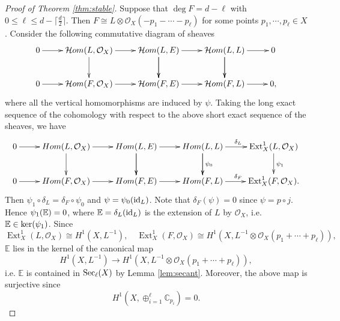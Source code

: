 \documentclass[12pt]{article}
\begin{document}
\begin{proof}[Proof of Theorem \ref{thm:stable}]
Suppose that $\deg F = d - \ell $ with $0 \leq \ell \leq d - \lceil \frac{d}{2} \rceil $. Then $F \cong L \otimes \mathcal O_{X}(-p_{1} - \cdots - p_{\ell})$ for some points $p_{1}, \cdots, p_{\ell} \in X$. Consider the following commutative diagram of sheaves
\[ \xymatrix{
0 \ar[r] & \mathcal{H}om(L, \mathcal O_{X}) \ar@{->}[d] \ar[r] & \mathcal{H}om(L, E)\ar[d]\ar@{->}[d]  \ar[r] &\mathcal{H}om(L, L) \ar[d]\ar@{->}[d] \ar[r] &0 \\
0 \ar[r] & \mathcal{H}om(F, \mathcal O_{X}) \ar[r]                         & \mathcal{H}om(F, E) \ar[r]                                 &\mathcal{H}om(F, L) \ar[r]                                  &0,
} \]
where all the vertical homomorphisms are induced by $\psi$. Taking the long exact sequence of the cohomology with respect to the above short exact sequence of the sheaves, we have
\[ \xymatrix{
0 \ar[r] & Hom(L, \mathcal O_{X}) \ar@{->}[d] \ar[r] & Hom(L, E)\ar[d]\ar@{->}[d]  \ar[r] &Hom(L, L) \ar[d]^{\psi_{0}}\ar@{->}[d] \ar[r]^{\delta_{L}} & \operatorname{Ext}^{1}_{X}(L, \mathcal O_{X})\ar[d]^{\psi_{1}} \\
0 \ar[r] & Hom(F, \mathcal O_{X}) \ar[r]                         & Hom(F, E) \ar[r]                                 &Hom(F, L) \ar[r]^{\delta_{F}}                                  &\operatorname{Ext}^{1}_{X}(F, \mathcal O_{X}).
} \]
Then $\psi_{1} \circ \delta_{L} = \delta_{F} \circ \psi_{0}$ and $\psi = \psi_{0} ({\rm id}_{L})$. Note that $\delta_{F}(\psi) = 0$ since $\psi = p \circ j$. Hence $\psi_{1} ({\Bbb E}) = 0$, where ${\Bbb E} = \delta_{L} ({\rm id}_{L})$ is the extension of $L$ by $\mathcal O_{X}$, i.e. ${\Bbb E} \in \ker (\psi_{1})$. Since
\[ \operatorname{Ext}_{X}^{1}(L, \mathcal O_{X}) \cong H^{1}(X, L^{-1}), \quad \operatorname{Ext}_{X}^{1}(F, \mathcal O_{X}) \cong H^{1}(X, L^{-1} \otimes \mathcal O_{X}(p_{1} + \cdots + p_{\ell})), \]
$\mathbb{E}$ lies in the kernel of the canonical map
\[ H^{1}(X, L^{-1}) \to H^{1}(X, L^{-1} \otimes \mathcal O_{X}(p_{1} + \cdots + p_{\ell})), \]
i.e. $\mathbb{E}$ is contained in ${\rm Sec}_{\ell}(X)$ by Lemma \ref{lem:secant}. Moreover, the above map is surjective since
\[ H^{1} \left(X, \oplus_{i=1}^{\ell} \mathbb C_{p_{i}} \right) = 0.\]



\end{proof}
\end{document}
